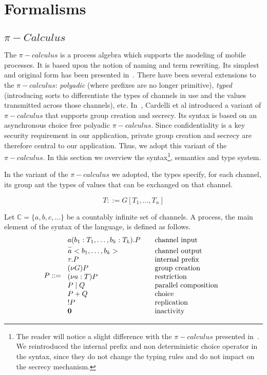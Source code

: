 \section{Formalisms} %
\label{sec:formalisms}

\subsection{$\pi-Calculus$} %
\label{sub:_pi_calculus_}

The $\pi-calculus$ is a process algebra which supports the modeling of mobile processes. It is based upon the notion of
naming and term rewriting. Its simplest and original form has been presented in~\cite{Milner-Parrow-Walker:89}. There
have been several extensions to the $\pi-calculus$: \emph{polyadic} (where prefixes are no longer primitive),
\emph{typed} (introducing sorts to differentiate the types of channels in use and the values transmitted across those
channels), etc. In~\cite{Cardelli-Ghelli-Gordon:05}, Cardelli et al introduced a variant of $\pi-calculus$ that supports
group creation and secrecy. Its syntax is based on an asynchronous choice free polyadic $\pi-calculus$. Since
confidentiality is a key security requirement in our application, private group creation and secrecy are therefore
central to our application. Thus, we adopt this variant of the $\pi-calculus$. In this section we overview the
syntax\footnote{The reader will notice a slight difference with the $\pi-calculus$ presented
in~\cite{Cardelli-Ghelli-Gordon:05}. We reintroduced the internal prefix and non deterministic choice operator in the
syntax, since they do not change the typing rules and do not impact on the secrecy mechanism.}, semantics and type
system.

In the variant of the $\pi-calculus$ we adopted, the types specify, for each channel, its group ant the types of values
that can be exchanged on that channel.

\begin{displaymath}
	T::=G[T_1,\ldots, T_n]
\end{displaymath}

Let $\mathbb{C}=\{a,b,c,\ldots\}$ be a countably infinite set of channels. A process, the main element of the syntax of the language, is defined as follows. 
\[
P::= \left. \begin{array}{l l}
a(b_1:T_1,\ldots,b_k:T_k).P & \quad \mbox{channel input}\\
\overset{-}{a}<b_1,\ldots,b_k> & \quad \mbox{channel output}\\
\tau.P & \quad \mbox{internal prefix}\\
(\nu G)P & \quad \mbox{group creation}\\
(\nu a:T)P & \quad \mbox{restriction}\\
P\mid Q & \quad \mbox{parallel composition}\\
P + Q & \quad \mbox{choice}\\
!P & \quad \mbox{replication}\\
\mathbf{0} & \quad \mbox{inactivity}\\
\end{array} \right.
\]

